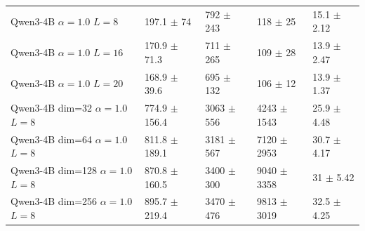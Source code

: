 \begin{tabular}{lllll}
 Qwen3-4B {\small $\alpha=1.0$} {\small $L=8$}                       & 197.1 {\small $\pm$ 74}     & 792 {\small $\pm$ 243}   & 118 {\small $\pm$ 25}     & 15.1 {\small $\pm$ 2.12} \\
 Qwen3-4B {\small $\alpha=1.0$} {\small $L=16$}                      & 170.9 {\small $\pm$ 71.3}   & 711 {\small $\pm$ 265}   & 109 {\small $\pm$ 28}     & 13.9 {\small $\pm$ 2.47} \\
 Qwen3-4B {\small $\alpha=1.0$} {\small $L=20$}                      & 168.9 {\small $\pm$ 39.6}   & 695 {\small $\pm$ 132}   & 106 {\small $\pm$ 12}     & 13.9 {\small $\pm$ 1.37} \\
 Qwen3-4B {\small dim=32} {\small $\alpha=1.0$} {\small $L=8$}       & 774.9 {\small $\pm$ 156.4}  & 3063 {\small $\pm$ 556}  & 4243 {\small $\pm$ 1543}  & 25.9 {\small $\pm$ 4.48} \\
 Qwen3-4B {\small dim=64} {\small $\alpha=1.0$} {\small $L=8$}       & 811.8 {\small $\pm$ 189.1}  & 3181 {\small $\pm$ 567}  & 7120 {\small $\pm$ 2953}  & 30.7 {\small $\pm$ 4.17} \\
 Qwen3-4B {\small dim=128} {\small $\alpha=1.0$} {\small $L=8$}      & 870.8 {\small $\pm$ 160.5}  & 3400 {\small $\pm$ 300}  & 9040 {\small $\pm$ 3358}  & 31 {\small $\pm$ 5.42}   \\
 Qwen3-4B {\small dim=256} {\small $\alpha=1.0$} {\small $L=8$}      & 895.7 {\small $\pm$ 219.4}  & 3470 {\small $\pm$ 476}  & 9813 {\small $\pm$ 3019}  & 32.5 {\small $\pm$ 4.25} \\
\bottomrule
\end{tabular}
